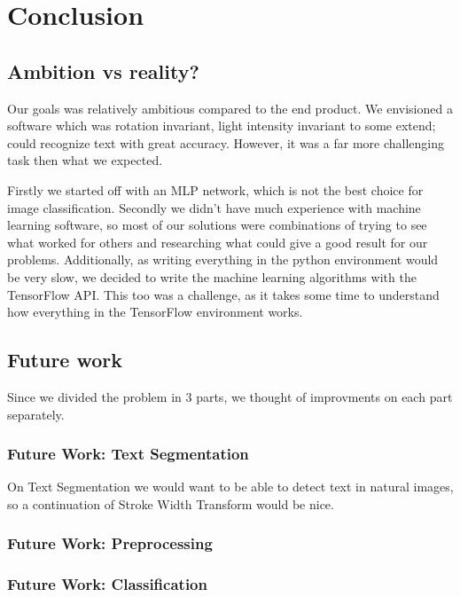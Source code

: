 \documentclass[Report.tex]{subfiles}
\begin{document}
\chapter{Conclusion}
\label{chap:Conclusion}

\section{Ambition vs reality?}
\begin{flushleft}
Our goals was relatively ambitious compared to the end product. We envisioned
a software which was rotation invariant, light intensity invariant to some
extend; could recognize text with great accuracy. However, it was a far more
challenging task then what we expected. \par
Firstly we started off with an MLP network, which is not the best choice for
image classification. Secondly we didn't have much experience with
machine learning software, so most of our solutions were combinations of
trying to see what worked for others and researching what could give a good result for
our problems. Additionally, as writing everything in the python environment
would be very slow, we decided to write the machine learning algorithms with the
TensorFlow API. This too was a challenge, as it takes some time to understand
how everything in the TensorFlow environment works.
\end{flushleft}

\section{Future work}
Since we divided the problem in 3 parts, we thought of improvments on each part separately.

\subsection{Future Work: Text Segmentation}
On Text Segmentation we would want to be able to detect text in natural images, so a continuation of Stroke Width Transform would be nice.

\subsection{Future Work: Preprocessing}

\subsection{Future Work: Classification}
\end{document}
